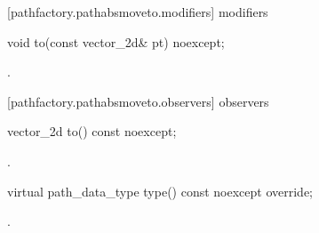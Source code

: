  [pathfactory.pathabsmoveto.modifiers]{ modifiers}

\begin{itemdecl}
    void to(const vector_2d& pt) noexcept;
\end{itemdecl}
\begin{itemdescr}
	\pnum
	\postconditions
	.
\end{itemdescr}

 [pathfactory.pathabsmoveto.observers]{ observers}

\begin{itemdecl}
    vector_2d to() const noexcept;
\end{itemdecl}
\begin{itemdescr}
	\pnum
	\returns
	.
\end{itemdescr}

\begin{itemdecl}
    virtual path_data_type type() const noexcept override;
\end{itemdecl}
\begin{itemdescr}
	\pnum
	\returns
	.
\end{itemdescr}
